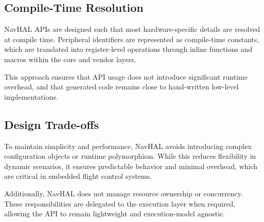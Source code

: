 \subsection*{Compile-Time Resolution}

NavHAL APIs are designed such that most hardware-specific details are resolved at compile time. Peripheral identifiers are represented as compile-time constants, which are translated into register-level operations through inline functions and macros within the core and vendor layers.

This approach ensures that API usage does not introduce significant runtime overhead, and that generated code remains close to hand-written low-level implementations.

\subsection*{Design Trade-offs}

To maintain simplicity and performance, NavHAL avoids introducing complex configuration objects or runtime polymorphism. While this reduces flexibility in dynamic scenarios, it ensures predictable behavior and minimal overhead, which are critical in embedded flight control systems.

Additionally, NavHAL does not manage resource ownership or concurrency. These responsibilities are delegated to the execution layer when required, allowing the API to remain lightweight and execution-model agnostic.